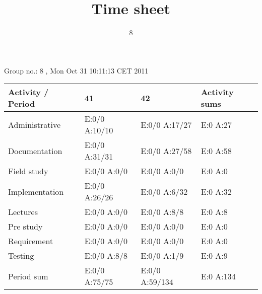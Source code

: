 \documentclass[a4paper]{article}
\title{Time sheet}
\author{8}
\begin{document}
\begin{landscape}
\begin{center}
	Group no.: 8
	, Mon Oct 31 10:11:13 CET 2011

	\begin{tabular}{| l | l | l | l |}
		\hline
		Activity / Period & 41 & 42 & Activity sums \\
		\hline \hline
		
Administrative & E:0/0 A:10/10 & E:0/0 A:17/27 & E:0 A:27 \\
Documentation & E:0/0 A:31/31 & E:0/0 A:27/58 & E:0 A:58 \\
Field study & E:0/0 A:0/0 & E:0/0 A:0/0 & E:0 A:0 \\
Implementation & E:0/0 A:26/26 & E:0/0 A:6/32 & E:0 A:32 \\
Lectures & E:0/0 A:0/0 & E:0/0 A:8/8 & E:0 A:8 \\
Pre study & E:0/0 A:0/0 & E:0/0 A:0/0 & E:0 A:0 \\
Requirement & E:0/0 A:0/0 & E:0/0 A:0/0 & E:0 A:0 \\
Testing & E:0/0 A:8/8 & E:0/0 A:1/9 & E:0 A:9 \\
Period sum & E:0/0 A:75/75 & E:0/0 A:59/134 & E:0 A:134 \\
		\hline
	\end{tabular}
\end{center}
\end{landscape}
\end{document}
